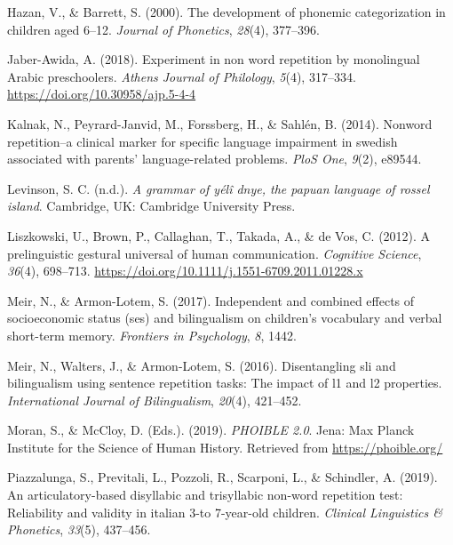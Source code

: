 \documentclass[english,,man,floatsintext]{apa6}
\begin{document}
\leavevmode\hypertarget{ref-hazan2000development}{}%
Hazan, V., \& Barrett, S. (2000). The development of phonemic categorization in children aged 6--12. \emph{Journal of Phonetics}, \emph{28}(4), 377--396.

\leavevmode\hypertarget{ref-jabere2018xperiment}{}%
Jaber-Awida, A. (2018). Experiment in non word repetition by monolingual Arabic preschoolers. \emph{Athens Journal of Philology}, \emph{5}(4), 317--334. \url{https://doi.org/10.30958/ajp.5-4-4}

\leavevmode\hypertarget{ref-kalnak2014nonword}{}%
Kalnak, N., Peyrard-Janvid, M., Forssberg, H., \& Sahlén, B. (2014). Nonword repetition--a clinical marker for specific language impairment in swedish associated with parents' language-related problems. \emph{PloS One}, \emph{9}(2), e89544.

\leavevmode\hypertarget{ref-levinsoninprepydgrammar}{}%
Levinson, S. C. (n.d.). \emph{A grammar of yélî dnye, the papuan language of rossel island}. Cambridge, UK: Cambridge University Press.

\leavevmode\hypertarget{ref-liszkowski2012prelinguistic}{}%
Liszkowski, U., Brown, P., Callaghan, T., Takada, A., \& de Vos, C. (2012). A prelinguistic gestural universal of human communication. \emph{Cognitive Science}, \emph{36}(4), 698--713. \url{https://doi.org/10.1111/j.1551-6709.2011.01228.x}

\leavevmode\hypertarget{ref-meir2017independent}{}%
Meir, N., \& Armon-Lotem, S. (2017). Independent and combined effects of socioeconomic status (ses) and bilingualism on children's vocabulary and verbal short-term memory. \emph{Frontiers in Psychology}, \emph{8}, 1442.

\leavevmode\hypertarget{ref-meir2016disentangling}{}%
Meir, N., Walters, J., \& Armon-Lotem, S. (2016). Disentangling sli and bilingualism using sentence repetition tasks: The impact of l1 and l2 properties. \emph{International Journal of Bilingualism}, \emph{20}(4), 421--452.

\leavevmode\hypertarget{ref-phoible}{}%
Moran, S., \& McCloy, D. (Eds.). (2019). \emph{PHOIBLE 2.0}. Jena: Max Planck Institute for the Science of Human History. Retrieved from \url{https://phoible.org/}

\leavevmode\hypertarget{ref-piazzalunga2019articulatory}{}%
Piazzalunga, S., Previtali, L., Pozzoli, R., Scarponi, L., \& Schindler, A. (2019). An articulatory-based disyllabic and trisyllabic non-word repetition test: Reliability and validity in italian 3-to 7-year-old children. \emph{Clinical Linguistics \& Phonetics}, \emph{33}(5), 437--456.
\end{document}
